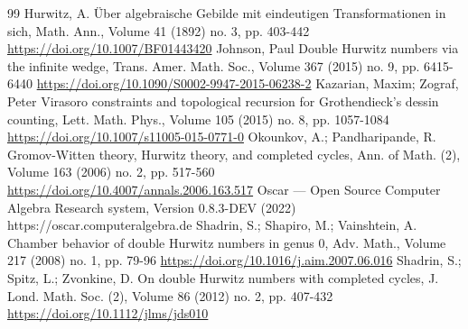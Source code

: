 \begin{thebibliography}{99}
 Hurwitz, A. Über algebraische Gebilde mit eindeutigen Transformationen in sich, Math. Ann., Volume 41 (1892) no. 3, pp. 403-442 \url{https://doi.org/10.1007/BF01443420}
 Johnson, Paul Double Hurwitz numbers via the infinite wedge, Trans. Amer. Math. Soc., Volume 367 (2015) no. 9, pp. 6415-6440 \url{https://doi.org/10.1090/S0002-9947-2015-06238-2}
 Kazarian, Maxim; Zograf, Peter Virasoro constraints and topological recursion for Grothendieck’s dessin counting, Lett. Math. Phys., Volume 105 (2015) no. 8, pp. 1057-1084 \url{https://doi.org/10.1007/s11005-015-0771-0}
 Okounkov, A.; Pandharipande, R. Gromov-Witten theory, Hurwitz theory, and completed cycles, Ann. of Math. (2), Volume 163 (2006) no. 2, pp. 517-560 \url{https://doi.org/10.4007/annals.2006.163.517}
 Oscar — Open Source Computer Algebra Research system, Version 0.8.3-DEV (2022) https://oscar.computeralgebra.de
 Shadrin, S.; Shapiro, M.; Vainshtein, A. Chamber behavior of double Hurwitz numbers in genus 0, Adv. Math., Volume 217 (2008) no. 1, pp. 79-96 \url{https://doi.org/10.1016/j.aim.2007.06.016}
 Shadrin, S.; Spitz, L.; Zvonkine, D. On double Hurwitz numbers with completed cycles, J. Lond. Math. Soc. (2), Volume 86 (2012) no. 2, pp. 407-432 \url{https://doi.org/10.1112/jlms/jds010}
\end{thebibliography}
